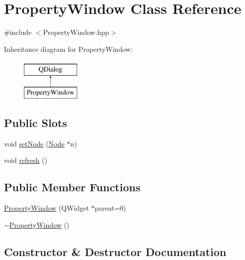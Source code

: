 \hypertarget{class_property_window}{}\section{Property\+Window Class Reference}
\label{class_property_window}


{\ttfamily \#include $<$Property\+Window.\+hpp$>$}

Inheritance diagram for Property\+Window\+:\begin{figure}[H]
\begin{center}
\leavevmode
\includegraphics[height=2.000000cm]{class_property_window}
\end{center}
\end{figure}
\subsection*{Public Slots}
\begin{DoxyCompactItemize}
\item 
void \hyperlink{class_property_window_a9cf01fbc71ed7f8272933dabeddc9e5f}{set\+Node} (\hyperlink{class_node}{Node} $\ast$n)
\item 
void \hyperlink{class_property_window_ad47ff8214d08fe5e7b8555c849224a93}{refresh} ()
\end{DoxyCompactItemize}
\subsection*{Public Member Functions}
\begin{DoxyCompactItemize}
\item 
\hyperlink{class_property_window_a64e1485e298f164b03ab49f00ce0295b}{Property\+Window} (Q\+Widget $\ast$parent=0)
\item 
\hyperlink{class_property_window_ae6d801af2d3ffc2c1de031da20d5dd6a}{$\sim$\+Property\+Window} ()
\end{DoxyCompactItemize}


\subsection{Constructor \& Destructor Documentation}
\hypertarget{class_property_window_a64e1485e298f164b03ab49f00ce0295b}{}
